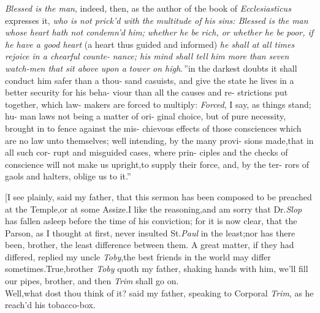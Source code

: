\documentclass{article}
\begin{document}
\lqq \textit{Blessed is the man}, indeed, then, as\break
\lqq the author of the book of \textit{Ecclesiasticus}\break
\lqq expresses it, \textit{who is not prick’d with the}\break
\lqq \textit{multitude of his sins: Blessed is the man}\break
\lqq \textit{whose heart hath not condemn’d him;}\break
\lqq \textit{whether he be rich, or whether he be}\break
\lqq \textit{poor, if he have a good heart} (a heart\break
\lqq thus guided and informed) \textit{he shall at}\break
\lqq \textit{all times rejoice in a chearful counte-}\break
\lqq \textit{nance; his mind shall tell him more than}
\lqq \textit{seven watch-men that sit above upon a}\break
\lqq \textit{tower on high}.\,” \lqq in the darkest doubts\break
\lqq it shall conduct him safer than a thou-\break
\lqq sand casuists, and give the state he\break
\lqq lives in a better security for his beha-\break
\lqq viour than all the causes and re-\break
\lqq strictions put together, which law-\break
\lqq makers are forced to multiply:\tsh\break
\lqq \textit{Forced}, I say, as things stand; hu-\break
\lqq man laws not being a matter of ori-\break
\lqq ginal choice, but of pure necessity,\break
\lqq brought in to fence against the mis-\break
\lqq chievous effects of those consciences\break
\lqq which are no law unto themselves;\break
\lqq well intending, by the many provi-\break
\lqq sions made,\tsh that in all such cor-\break
\lqq rupt and misguided cases, where prin-\break
\lqq ciples and the checks of conscience\break
\lqq will not make us upright,\tsh to
\lqq supply their force, and, by the ter-\break
\lqq rors of gaols and halters, oblige us\break
\lqq to it.”

[I see plainly, said my father, that\break
this sermon has been composed to be\break 
preached at the Temple,\tsh or at some
Assize.\tsh I like the reasoning,\tsh and
am sorry that Dr.\@ \textit{Slop} has fallen asleep
before the time of his conviction;\tsh\break
for it is now clear, that the Parson, as
I thought at first, never insulted St.\@ \textit{Paul}
in the least;\tsk nor has there been, bro\-ther, the least difference
between them.\break
\tsh A great matter, if they had differed,
replied my uncle \textit{Toby},\tsk the best friends in the world
may differ sometimes.\tsh True,\tsk brother \textit{Toby}
quoth my father, shaking hands with him,\tsk\break
we’ll fill our pipes, brother, and then\break
\textit{Trim} shall go on.\\
\newpage
Well,\tsk what dost thou think of it? said my father,
speaking to Corporal \textit{Trim}, as he reach’d his
tobacco-box.
\end{document}
